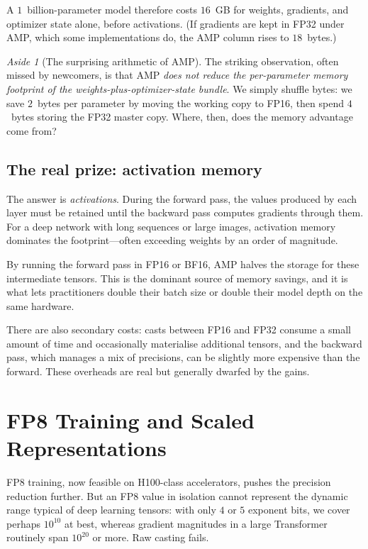 \documentclass[11pt,a4paper]{article}
\theoremstyle{definition}
\theoremstyle{remark}
\newtheorem*{aside}{Aside}
\theoremstyle{plain}
\begin{document}
A $1$~billion-parameter model therefore costs $16$~GB for weights,
gradients, and optimizer state alone, before activations. (If gradients are
kept in FP32 under AMP, which some implementations do, the AMP column rises
to $18$~bytes.)

\begin{aside}[The surprising arithmetic of AMP]
The striking observation, often missed by newcomers, is that AMP
\emph{does not reduce the per-parameter memory footprint of the
weights-plus-optimizer-state bundle}. We simply shuffle bytes: we save
$2$~bytes per parameter by moving the working copy to FP16, then spend
$4$~bytes storing the FP32 master copy. Where, then, does the memory
advantage come from?
\end{aside}

\subsection{The real prize: activation memory}

The answer is \emph{activations}. During the forward pass, the values
produced by each layer must be retained until the backward pass computes
gradients through them. For a deep network with long sequences or large
images, activation memory dominates the footprint---often exceeding
weights by an order of magnitude.

By running the forward pass in FP16 or BF16, AMP halves the storage for
these intermediate tensors. This is the dominant source of memory
savings, and it is what lets practitioners double their batch size or
double their model depth on the same hardware.

There are also secondary costs: casts between FP16 and FP32 consume a
small amount of time and occasionally materialise additional tensors, and
the backward pass, which manages a mix of precisions, can be slightly
more expensive than the forward. These overheads are real but generally
dwarfed by the gains.

\section{FP8 Training and Scaled Representations}

FP8 training, now feasible on H100-class accelerators, pushes the
precision reduction further. But an FP8 value in isolation cannot
represent the dynamic range typical of deep learning tensors: with only
$4$ or $5$ exponent bits, we cover perhaps $10^{10}$ at best, whereas
gradient magnitudes in a large Transformer routinely span $10^{20}$ or
more. Raw casting fails.
\end{document}
